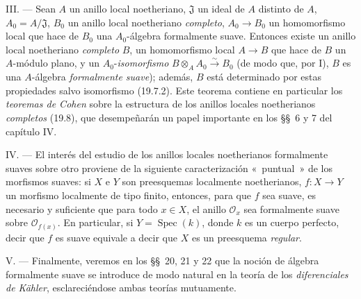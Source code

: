 \begin{env}[19.0.2]
\medskip\noindent III. --- Sean $A$ un anillo local noetheriano,
$\mathfrak J$ un ideal de $A$ distinto de $A$, $A_0=A/\mathfrak J$, $B_0$ un
anillo local noetheriano \emph{completo}, $A_0\to B_0$ un homomorfismo local
que hace de $B_0$ una $A_0$-álgebra formalmente suave. Entonces existe un
anillo local noetheriano \emph{completo} $B$, un homomorfismo local $A\to B$
que hace de $B$ un $A$-módulo plano, y un $A_0$-\emph{isomorfismo}
$B\otimes_A A_0\xrightarrow{\sim}B_0$
(de modo que, por I), $B$ es una $A$-álgebra \emph{formalmente suave}); además,
$B$ está determinado por estas propiedades salvo isomorfismo (19.7.2). Este
teorema contiene en particular los \emph{teoremas de Cohen} sobre la estructura
de los anillos locales noetherianos \emph{completos} (19.8), que desempeñarán un papel
importante en los §§~6 y 7 del capítulo IV.

\medskip\noindent IV. --- El interés del estudio de los anillos locales
noetherianos formalmente suaves sobre otro proviene de la siguiente caracterización
«~puntual~» de los morfismos suaves: si $X$ e $Y$ son
preesquemas localmente noetherianos, $f:X\to Y$ un morfismo localmente de tipo
finito, entonces, para que $f$ sea suave, es necesario y suficiente que para todo
$x\in X$, el anillo $\mathcal O_x$ sea formalmente suave sobre
$\mathcal O_{f(x)}$. En particular, si $Y=\operatorname{Spec}(k)$, donde $k$ es
un cuerpo perfecto, decir que $f$ es suave equivale a decir que $X$ es un
preesquema \emph{regular}.

\medskip\noindent V. --- Finalmente, veremos en los §§~20, 21 y 22 que
la noción de álgebra formalmente suave se introduce de modo natural en la
teoría de los \emph{diferenciales de Kähler}, esclareciéndose ambas teorías
mutuamente.
\end{env}

